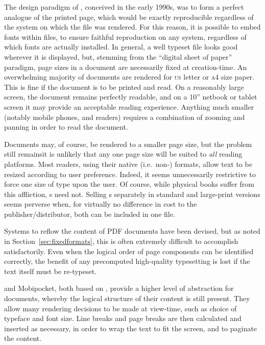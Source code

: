 The design paradigm of \pdf{}, conceived in the early 1990s,\hspace{0pt}\cite{Warnock1991} was to form a perfect analogue of the printed page, which would be exactly reproducible regardless of the system on which the file was rendered. For this reason, it is possible to embed fonts within \pdf{} files, to ensure faithful reproduction on any system, regardless of which fonts are actually installed. In general, a well typeset \pdf{} file looks good wherever it is displayed, but, stemming from the ``digital sheet of paper'' paradigm, page sizes in a \pdf{} document are necessarily fixed at creation-time. An overwhelming majority of \pdf{} documents are rendered for  \textsc{us} letter or \textsc{a}4 size paper. This is fine if the document is to be printed and read. On a reasonably large screen, the document remains perfectly readable, and on a 10'' netbook or tablet screen it may provide an acceptable reading experience. Anything much smaller (notably mobile phones, and \ebook{} readers) requires a combination of zooming and panning  in order to read the document.

Documents may, of course, be rendered to a smaller page size, but the problem still remains\ed it is unlikely that any one page size will be suited to \emph{all} reading platforms. Most \ebook{} readers, using their native (i.e.\ non-\pdf{}) formats, allow text to be resized according to user preference. Indeed, it seems unnecessarily restrictive to force one size of type upon the user. Of course, while physical books suffer from this affliction, \ebook{}s need not. Selling \ebook{}s separately in standard and large-print versions seems perverse when, for virtually no difference in cost to the publisher/distributor, both can be included in one file.

Systems to reflow the content of PDF documents have been devised,\hspace{0pt}\cite{Lovegrove1995,Marinai2013} but as noted in Section~\ref{sec:fixedformats}, this is often extremely difficult to accomplish satisfactorily. Even when the logical order of page components can be identified correctly, the benefit of any precomputed high-quality typesetting is lost if the text itself must be re-typeset.



\epub{} and Mobipocket, both based on \html{}, provide a higher level of abstraction for documents, whereby the logical structure of their content is still present. They allow many rendering decisions to be made at view-time, such as choice of typeface and font size. Line breaks and page breaks are then calculated and inserted as necessary, in order to wrap the text to fit the screen, and to paginate the content.

